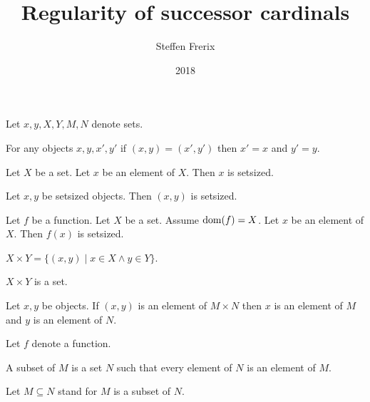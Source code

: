 \documentclass{article}
\title{Regularity of successor cardinals}
\author{Steffen Frerix}
\date{2018}
\newcommand{\Prod}[2]{#1\times #2}
\begin{document}

  \maketitle

  \begin{forthel}

    Let $x, y, X, Y, M, N$ denote sets.

    \begin{axiom}
      For any objects $x,y,x',y'$ if $(x, y) = (x', y')$ then $x' = x$ and $y' = y$.
    \end{axiom}

    \begin{axiom}
      Let $X$ be a set.
      Let $x$ be an element of $X$. Then $x$ is setsized.
    \end{axiom}

    \begin{axiom}
      Let $x,y$ be setsized objects. Then $(x, y)$ is setsized.
    \end{axiom}

    \begin{axiom}
      Let $f$ be a function.
      Let $X$ be a set.
      Assume $\operatorname{dom}(f) = X$.
      Let $x$ be an element of $X$. Then $f(x)$ is setsized.
    \end{axiom}

    \begin{definition}
      $\Prod{X}{Y} = \{(x,y) \mid x \in X \wedge y \in Y\}$.
    \end{definition}

    \begin{axiom}
      $\Prod{X}{Y}$ is a set.
    \end{axiom}

    \begin{lemma}
      Let $x,y$ be objects.
      If $(x,y)$ is an element of $\Prod{M}{N}$
      then $x$ is an element of $M$ and $y$ is an element of $N$.
    \end{lemma}

    Let $f$ denote a function.

    \begin{definition}
      A subset of $M$ is a set $N$ such that every element of $N$ is an element of $M$.
    \end{definition}

    Let $M\subseteq N$ stand for $M$ is a subset of $N$.


\end{forthel}
\end{document}
